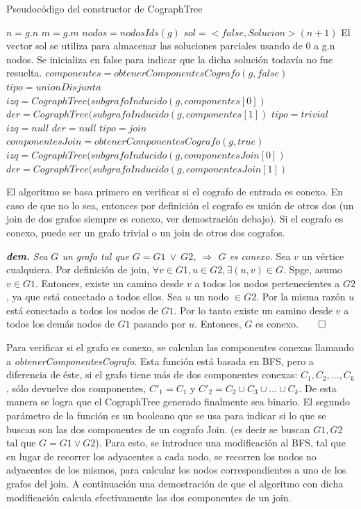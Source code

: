 \begin{algorithm}[H]
  \begin{algorithmic}[1]
  \caption{Pseudocódigo del constructor de CographTree}
  \label{algo:3-1}
	\State $n = g.n$
	\State $m = g.m$
	\State $nodos = nodosIds(g)$
	\State $sol = <false, Solucion>(n+1)$
	\State \Comment El vector sol se utiliza para almacenar las soluciones parciales usando de 0 a g.n nodos. Se inicializa en false para indicar que la dicha solución todavía no fue resuelta.
	\State $componentes = obtenerComponentesCografo(g, false)$
		\State $tipo = unionDisjunta$
		\State $izq = CographTree(subgrafoInducido(g, componentes[0])$
		\State $der = CographTree(subgrafoInducido(g, componentes[1])$
		\State $tipo = trivial$
		\State $izq = null$
		\State $der = null$
	\Else
		\State $tipo = join$
		\State $componentesJoin = obtenerComponentesCografo(g, true)$
		\State $izq = CographTree(subgrafoInducido(g, componentesJoin[0])$
		\State $der = CographTree(subgrafoInducido(g, componentesJoin[1])$
	\EndIf
	\EndProcedure
	\end{algorithmic}
\end{algorithm}

El algoritmo se basa primero en verificar si el cografo de entrada es conexo. En caso de que no lo sea, entonces por definición el cografo es unión de otros dos (un join de dos grafos siempre es conexo, ver demostración debajo). Si el cografo es conexo, puede ser un grafo trivial o un join de otros dos cografos.

\emph{\textbf{dem.}} \textit{Sea $G$ un grafo tal que $G = G1\ \lor\ G2$, $\Rightarrow$ $G$ es conexo.} Sea $v$ un vértice cualquiera. Por definición de join, $\forall v \in G1, u \in G2, \exists (u, v) \in G$. Spge, asumo $v \in G1$. Entonces, existe un camino desde $v$ a todos los nodos pertenecientes a $G2$, ya que está conectado a todos ellos. Sea $u$ un nodo $\in G2$. Por la misma razón $u$ está conectado a todos los nodos de $G1$. Por lo tanto existe un camino desde $v$ a todos los demás nodos de $G1$ pasando por $u$. Entonces, $G$ es conexo.$\qed$

Para verificar si el grafo es conexo, se calculan las componentes conexas llamando a \emph{obtenerComponentesCografo}. Esta función está basada en BFS, pero a diferencia de éste, si el grafo tiene más de dos componentes conexas: $C_1, C_2, ..., C_k$, sólo devuelve dos componentes, $C'_1 = C_1$ y $C'_2 = C_2 \cup C_3 \cup ... \cup C_k$. De esta manera se logra que el CographTree generado finalmente sea binario. El segundo parámetro de la función es un booleano que se usa para indicar si lo que se buscan son las dos componentes de un cografo Join. (es decir se buscan $G1, G2$ tal que $G = G1 \lor G2$). Para esto, se introduce una modificación al BFS, tal que en lugar de recorrer los adyacentes a cada nodo, se recorren los nodos no adyacentes de los mismos, para calcular los nodos correspondientes a uno de los grafos del join. A continuación una demostración de que el algoritmo con dicha modificación calcula efectivamente las dos componentes de un join.

